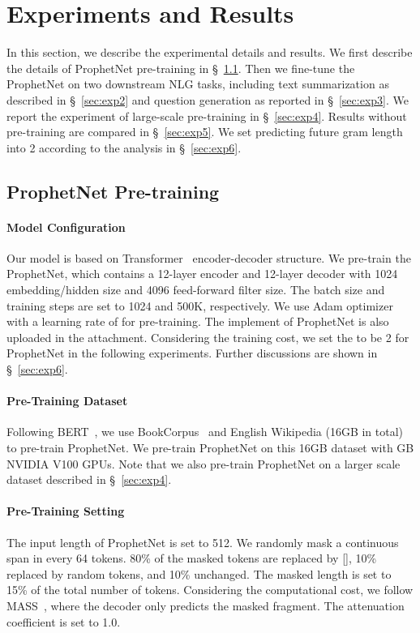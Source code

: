 \documentclass[11pt,a4paper]{article}
\begin{document}
\section{Experiments and Results}
In this section, we describe the experimental details and results.
We first describe the details of ProphetNet pre-training in \S~\ref{sec:exp1}.
Then we fine-tune the ProphetNet on two downstream NLG tasks, including text summarization as described in \S~\ref{sec:exp2} and question generation as reported in \S~\ref{sec:exp3}.
We report the experiment of large-scale pre-training in \S~\ref{sec:exp4}. Results without pre-training are compared in \S~\ref{sec:exp5}. We set predicting future gram length into 2 according to the analysis in \S~\ref{sec:exp6}.


\subsection{ProphetNet Pre-training}\label{sec:exp1}
\paragraph{Model Configuration} 
Our model is based on Transformer~\cite{vaswani2017attention} encoder-decoder structure. 
We pre-train the ProphetNet, which contains a 12-layer encoder and 12-layer decoder with 1024 embedding/hidden size and 4096 feed-forward filter size. The batch size and training steps are set to 1024 and 500K, respectively. 
We use Adam optimizer~\cite{kingma2014adam} with a learning rate of  for pre-training. 
The implement of ProphetNet is also uploaded in the attachment.
Considering the training cost, we set the  to be 2 for ProphetNet in the following experiments. Further discussions are shown in \S~\ref{sec:exp6}.


\paragraph{Pre-Training Dataset} 
Following BERT~\cite{devlin2018bert}, we use BookCorpus~\cite{zhu2015aligning} and English Wikipedia (16GB in total) to pre-train ProphetNet.
We pre-train ProphetNet on this 16GB dataset with GB NVIDIA V100 GPUs.
Note that we also pre-train ProphetNet on a larger scale dataset described in \S~\ref{sec:exp4}.


\paragraph{Pre-Training Setting}
The input length of ProphetNet is set to 512.
We randomly mask a continuous span in every 64 tokens. 
80\% of the masked tokens are replaced by [], 10\% replaced by random tokens, and 10\% unchanged. 
The masked length is set to 15\% of the total number of tokens. Considering the computational cost, we follow MASS~\cite{song2019mass}, where the decoder only predicts the masked fragment. The attenuation coefficient  is set to 1.0.
\end{document}
